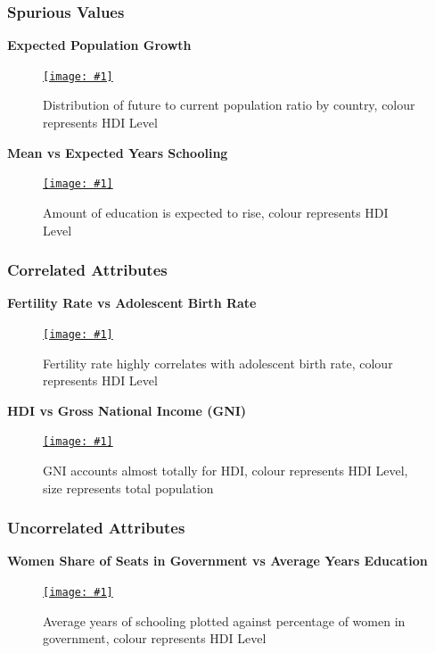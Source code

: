 \documentclass[11pt,a4paper,final]{article}
\newcommand\onlinefig[3]{
\begin{figure}[H]
  \centering
  \href{#3}{\texttt{[image: \#1]}}
  \caption{#2} 
  \label{fig:#1}
\end{figure}
}
\begin{document}
\begin{multicols}{2}
\subsubsection{Spurious Values}
\textbf{Expected Population Growth}
\onlinefig{population_growth_ratio_boxplot}{Distribution of future to current population ratio by country, colour represents HDI Level}{https://public.tableau.com/views/CS3205-HDI/Sheet11?:language=en-GB&:display_count=n&:origin=viz_share_link}

\begin{flushleft}
\textbf{Mean vs Expected Years Schooling}
\end{flushleft}
\vspace{-2cm}
\onlinefig{mean_vs_expected_years_schooling_scatterplot.png}{Amount of education is expected to rise, colour represents HDI Level}{https://public.tableau.com/views/CS3205-HDI/Sheet7?:language=en-GB&:display_count=n&:origin=viz_share_link}

\subsubsection{Correlated Attributes}
\begin{flushleft}
\textbf{Fertility Rate vs Adolescent Birth Rate}
\end{flushleft}
\onlinefig{fertility_vs_adolescent_birth_rate_scatterplot}{Fertility rate highly correlates with adolescent birth rate, colour represents HDI Level}{https://public.tableau.com/views/CS3205-HDI/Sheet10?:language=en-GB&:display_count=n&:origin=viz_share_link}

\begin{flushleft}
\textbf{HDI vs Gross National Income (GNI)}
\end{flushleft}
\onlinefig{gni_vs_hdi_scatterplot}{GNI accounts almost totally for HDI, colour represents HDI Level, size represents total population}{https://public.tableau.com/views/CS3205-HDI/Sheet5?:language=en-GB&:display_count=n&:origin=viz_share_link}

\subsubsection{Uncorrelated Attributes}
\textbf{Women Share of Seats in Government vs Average Years Education}
\onlinefig{percentage_women_in_government_vs_mean_years_education_scatterplot.png}{Average years of schooling plotted against percentage of women in government, colour represents HDI Level}{https://public.tableau.com/views/CS3205-HDI/Sheet12?:language=en-GB&:display_count=n&:origin=viz_share_link}


\end{multicols}
\end{document}
